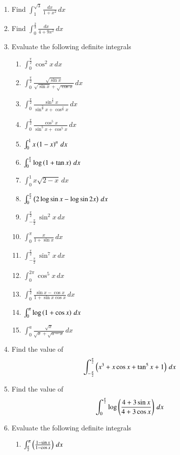 \begin{enumerate}[label=\arabic*.,ref=\thesubsection.\theenumi]
\item Find $\int_{1}^{\sqrt{3}}\frac{dx}{1+x^2}\, dx$
\item Find $\int_{0}^{\frac{2}{3}}\frac{dx}{4+9x^2}\, dx$
%
\item Evaluate the following definite integrals
%
\begin{enumerate}[label = (\roman*)]
\item $\int_{0}^{\frac{\pi}{2}}\cos^2{x}\, dx$
\item $\int_{0}^{\frac{\pi}{2}}\frac{\sqrt{\sin x}}{\sqrt{\sin x}+\sqrt{\cos x}}\, dx$
\item $\int_{0}^{\frac{\pi}{2}}\frac{\sin^{\frac{3}{2}} x}{\sin^{\frac{3}{2}} x+\cos^{\frac{3}{2}} x}\, dx$
\item $\int_{0}^{\frac{\pi}{2}}\frac{\cos^5 x}{\sin^5 x+\cos^5 x}\, dx$
\item $\int_{0}^{1}x\left(1-x\right)^n\, dx$
\item $\int_{0}^{\frac{\pi}{4}}\log\left(1+\tan x\right)\, dx$
\item $\int_{0}^{1}x\sqrt{2-x}\, dx$
\item $\int_{0}^{\frac{\pi}{2}}\left(2\log\sin x - \log \sin 2x\right)\, dx$
\item $\int_{-\frac{\pi}{2}}^{\frac{\pi}{2}}\sin^2 x\, dx$
\item $\int_{0}^{\pi}\frac{x}{1+\sin x}\, dx$
\item $\int_{-\frac{\pi}{2}}^{\frac{\pi}{2}}\sin^7 x\, dx$
\item $\int_{0}^{2\pi}\cos^5 x\, dx$
\item $\int_{0}^{\frac{\pi}{2}}\frac{\sin x - \cos x}{1+\sin x \cos x}\, dx$
\item $\int_{0}^{\pi}\log\left(1+\cos x\right)\, dx$
\item $\int_{0}^{a}\frac{\sqrt{x}}{\sqrt{x}+\sqrt{a-x}}\, dx$
\end{enumerate}
%
\item Find the value of 
%
\begin{align}
\int_{-\frac{\pi}{2}}^{\frac{\pi}{2}}\left(x^3+x\cos x + \tan^5 x + 1\right)\,dx
\end{align}
%
\item Find the value of 
%
\begin{align}
\int_{0}^{\frac{\pi}{2}}\log\left(\frac{4+3\sin x}{4+3\cos x}\right)\,dx
\end{align}
\item Evaluate the following definite integrals
%
\begin{enumerate}[label = (\roman*)]
\item $\int_{\frac{\pi}{2}}^{\pi}\left(\frac{1-\sin x}{1-\cos x}\right)\, dx$

\end{enumerate}
\end{enumerate}
